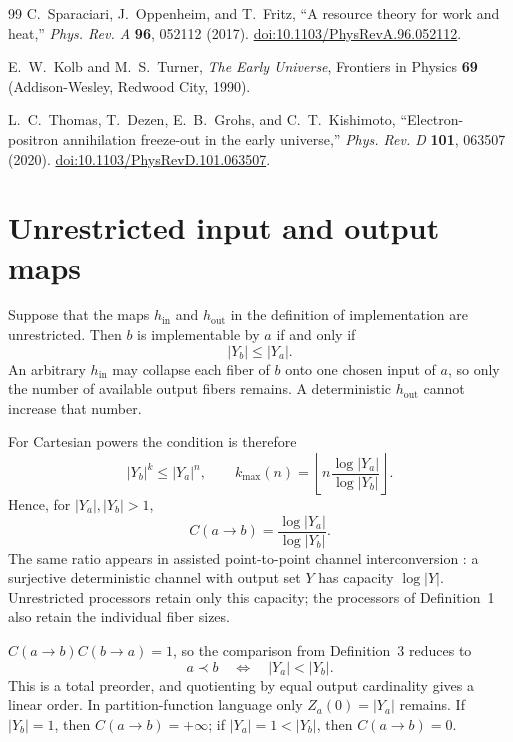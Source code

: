 \documentclass[11pt]{article}
\theoremstyle{definition}
\theoremstyle{remark}
\begin{document}
\begin{thebibliography}{99}
C.~Sparaciari, J.~Oppenheim, and T.~Fritz,
``A resource theory for work and heat,''
\emph{Phys. Rev. A} \textbf{96}, 052112 (2017).
\href{https://doi.org/10.1103/PhysRevA.96.052112}
{doi:10.1103/PhysRevA.96.052112}.

E.~W.~Kolb and M.~S.~Turner,
\emph{The Early Universe},
Frontiers in Physics \textbf{69} (Addison-Wesley, Redwood City, 1990).

L.~C.~Thomas, T.~Dezen, E.~B.~Grohs, and C.~T.~Kishimoto,
``Electron-positron annihilation freeze-out in the early universe,''
\emph{Phys. Rev. D} \textbf{101}, 063507 (2020).
\href{https://doi.org/10.1103/PhysRevD.101.063507}
{doi:10.1103/PhysRevD.101.063507}.

\end{thebibliography}

\appendix
\section{Unrestricted input and output maps}

Suppose that the maps \(h_{\mathrm{in}}\) and \(h_{\mathrm{out}}\) in the
definition of implementation are unrestricted.  Then \(b\) is implementable
by \(a\) if and only if
\[
  |Y_b|\leq |Y_a|.
\]
An arbitrary \(h_{\mathrm{in}}\) may collapse each fiber of \(b\) onto one
chosen input of \(a\), so only the number of available output fibers remains.
A deterministic \(h_{\mathrm{out}}\) cannot increase that number.

For Cartesian powers the condition is therefore
\[
  |Y_b|^k\leq |Y_a|^n,
  \qquad
  k_{\max}(n)
  =\left\lfloor
    n\frac{\log|Y_a|}{\log|Y_b|}
   \right\rfloor.
\]
Hence, for \(|Y_a|,|Y_b|>1\),
\[
  \boxed{\displaystyle
  C(a\to b)=\frac{\log|Y_a|}{\log|Y_b|}}.
\]
The same ratio appears in assisted point-to-point channel interconversion
\cite{cao-et-al-2024}: a surjective deterministic channel with output set
\(Y\) has capacity \(\log|Y|\).  Unrestricted processors retain only this
capacity; the processors of Definition~1 also retain the individual fiber
sizes.

\(C(a\to b)C(b\to a)=1\), so the comparison from
Definition~3 reduces to
\[
  a\prec b
  \quad\Longleftrightarrow\quad
  |Y_a|<|Y_b|.
\]
This is a total preorder, and quotienting by equal output cardinality gives a
linear order.  In partition-function language only
\(Z_a(0)=|Y_a|\) remains.  If \(|Y_b|=1\), then
\(C(a\to b)=+\infty\); if \(|Y_a|=1<|Y_b|\), then \(C(a\to b)=0\).
\end{document}
